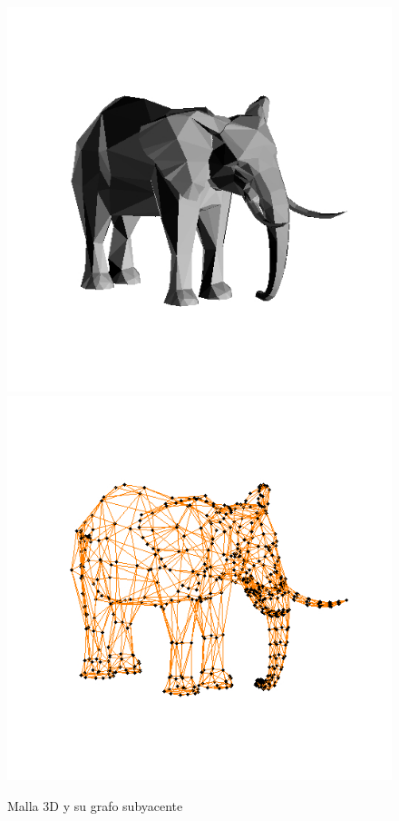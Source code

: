 \documentclass[10pt, a4paper, twocolumn]{article} %
\begin{document}
\begin{figure}
	\includegraphics[scale=.21]{elephav_solid.jpg} %
	\includegraphics[scale=.21]{elephav_graph.jpg} %
	\caption{Malla 3D y su grafo subyacente}%
	\label{fig:elephant} %
\end{figure}
\end{document}
